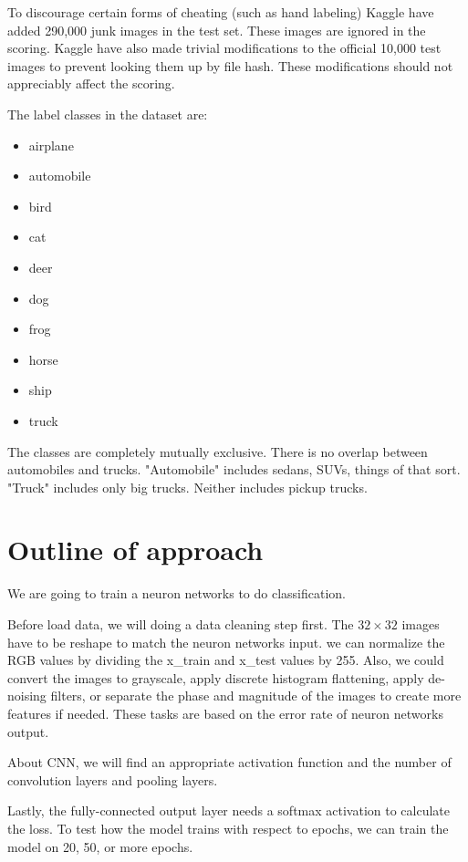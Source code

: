 \documentclass{article}
\begin{document}
To discourage certain forms of cheating (such as hand labeling) Kaggle have added 290,000 junk images in the test set. These images are ignored in the scoring. Kaggle have also made trivial modifications to the official 10,000 test images to prevent looking them up by file hash. These modifications should not appreciably affect the scoring.

The label classes in the dataset are:
\begin{itemize}
    \item airplane 
    \item automobile 
    \item bird 
    \item cat 
    \item deer 
    \item dog 
    \item frog 
    \item horse 
    \item ship 
    \item truck
\end{itemize}

The classes are completely mutually exclusive. There is no overlap between automobiles and trucks. "Automobile" includes sedans, SUVs, things of that sort. "Truck" includes only big trucks. Neither includes pickup trucks.
\section{Outline of approach}
\hspace{1.5em}We are going to train a neuron networks to do classification.

Before load data, we will doing a data cleaning step first. The $32\times32$ images have to be reshape to match the neuron networks input.
we can normalize the RGB values by dividing the x\_train and x\_test values by 255.
Also, we could convert the images to grayscale, apply discrete histogram flattening, apply de-noising filters, or separate the phase and magnitude of the images to create more features if needed. These tasks are based on the error rate of neuron networks output.

About CNN, we will find an appropriate activation function and the number of convolution layers and pooling layers.

Lastly, the fully-connected output layer needs a softmax activation to calculate the loss. To test how the model trains with respect to epochs, we can train the model on 20, 50, or more epochs.
\end{document}
